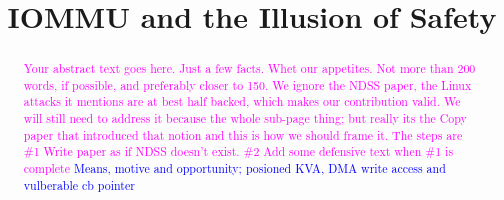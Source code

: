 \usepackage{filecontents}

\providecommand{\data}{\textit{data }}
\providecommand{\shinfo}{\texttt{skb\_shared\_info }}
\providecommand{\skb}{\texttt{sk\_buff }}
\providecommand{\page}{\texttt{struct page }}
\providecommand{\uarg}{\texttt{ubuf\_info }}
\providecommand{\kva}{KVA }
\providecommand{\iova}{IOVA }
\providecommand{\mabaf}{malicious buffer }
\providecommand{\spb}{SPB\-2 }
\providecommand{\oportunity}{\textit{Opportunity} }
\providecommand{\means}{\textit{Means} }


\date{}

\title{\Large \bf IOMMU and the Illusion of Safety}

\begin{comment}
\author{
{\rm Markuze Alex}\\
Technion, VMware Research
\and
{\rm Gil Kupfer}\\
Technion
\and
{\rm Nadav Amit}\\
VMware Research
\and{\rm Dan Tsafrir}\\
Technion, VMware Research
} %
\end{comment}

\maketitle

\begin{abstract}
\textcolor{magenta}{Your abstract text goes here. Just a few facts. Whet our appetites.
Not more than 200 words, if possible, and preferably closer to 150.\newline
We ignore the NDSS paper, the Linux attacks it mentions are at best half backed, which makes our contribution valid. We will still need to address it because the whole sub-page thing; but really its the Copy paper that introduced that notion and this is how we should frame it. The steps are \#1 Write paper as if NDSS doesn't exist. \#2 Add some defensive text when \#1 is complete}
\newline
\textcolor{blue}{Means, motive and opportunity; posioned KVA, DMA write access and vulberable cb pointer}
\end{abstract}


